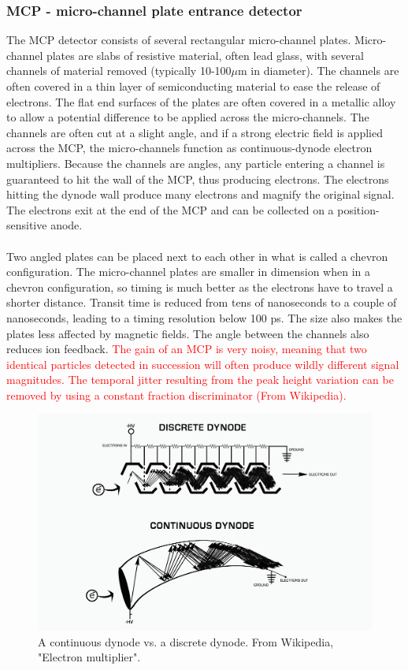 \documentclass{article}
\begin{document}
\subsubsection{MCP - micro-channel plate entrance detector}
The MCP detector consists of several rectangular micro-channel plates.
Micro-channel plates are slabs of resistive material, often lead glass, with several channels of material removed (typically 10-100$\mu$m in diameter).
The channels are often covered in a thin layer of semiconducting material to ease the release of electrons.
The flat end surfaces of the plates are often covered in a metallic alloy to allow a potential difference to be applied across the micro-channels.
The channels are often cut at a slight angle, and if a strong electric field is applied across the MCP, the micro-channels function as continuous-dynode electron multipliers.
Because the channels are angles, any particle entering a channel is guaranteed to hit the wall of the MCP, thus producing electrons.
The electrons hitting the dynode wall produce many electrons and magnify the original signal.
The electrons exit at the end of the MCP and can be collected on a position-sensitive anode.
\\\\
Two angled plates can be placed next to each other in what is called a chevron configuration.
The micro-channel plates are smaller in dimension when in a chevron configuration, so timing is much better as the electrons have to travel a shorter distance.
Transit time is reduced from tens of nanoseconds to a couple of nanoseconds, leading to a timing resolution below 100 ps.
The size also makes the plates less affected by magnetic fields.
The angle between the channels also reduces ion feedback.
\textcolor{red}{The gain of an MCP is very noisy, meaning that two identical particles detected in succession will often produce wildly different signal magnitudes. The temporal jitter resulting from the peak height variation can be removed by using a constant fraction discriminator (From Wikipedia).}
\begin{figure}[htbp!]
    \centering
    \includegraphics[width=0.5\linewidth]{Figures/PRISMA/MCP/Discrete_and_Continuous_Dynode_Systems.jpg}
    \caption{A continuous dynode vs. a discrete dynode. From Wikipedia, "Electron multiplier".}
    \label{fig:contDyn}
\end{figure}
\end{document}
